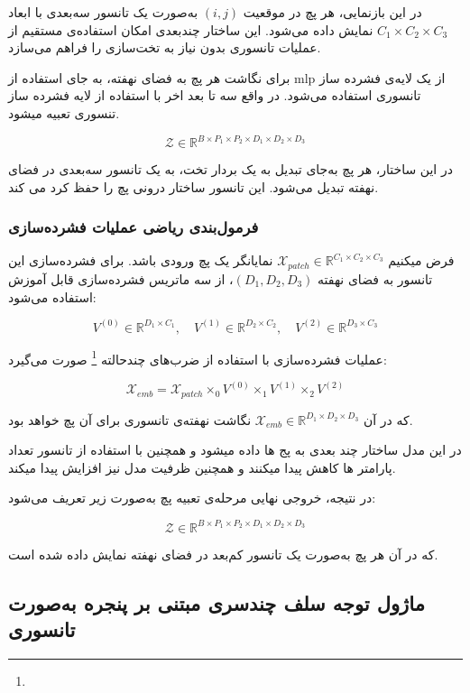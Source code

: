 در این بازنمایی، هر پچ در موقعیت $(i,j)$ به‌صورت یک تانسور سه‌بعدی با ابعاد $C_1 \times C_2 \times C_3$ نمایش داده می‌شود. این ساختار چندبعدی امکان استفاده‌ی مستقیم از عملیات تانسوری بدون نیاز به تخت‌سازی را فراهم می‌سازد.



برای نگاشت هر پچ به فضای نهفته، به جای استفاده از mlp  از یک لایه‌ی فشرده ساز تانسوری  استفاده می‌شود. در واقع سه تا بعد اخر با استفاده از لایه فشرده ساز تنسوری تعبیه میشود.

\[
\mathcal{Z} \in \mathbb{R}^{B \times P_1 \times P_2 \times D_1 \times D_2 \times D_3}
\]

در این ساختار، هر پچ به‌جای تبدیل به یک بردار تخت، به یک تانسور سه‌بعدی در فضای نهفته تبدیل می‌شود. این تانسور ساختار درونی پچ را حفظ کرد می کند. 

\subsubsection*{فرمول‌بندی ریاضی عملیات فشرده‌سازی}

فرض میکنیم  $\mathcal{X}_{patch} \in \mathbb{R}^{C_1 \times C_2 \times C_3}$ نمایانگر یک پچ ورودی باشد. برای فشرده‌سازی این تانسور به فضای نهفته $(D_1, D_2, D_3)$، از سه ماتریس فشرده‌سازی قابل آموزش استفاده می‌شود:

\[
V^{(0)} \in \mathbb{R}^{D_1 \times C_1}, \quad
V^{(1)} \in \mathbb{R}^{D_2 \times C_2}, \quad
V^{(2)} \in \mathbb{R}^{D_3 \times C_3}
\]

عملیات فشرده‌سازی با استفاده از ضرب‌های چندحالته \footnote{} صورت می‌گیرد:

\[
\mathcal{X}_{emb} = \mathcal{X}_{patch} \times_0 V^{(0)} \times_1 V^{(1)} \times_2 V^{(2)}
\]

که در آن $\mathcal{X}_{emb} \in \mathbb{R}^{D_1 \times D_2 \times D_3}$ نگاشت نهفته‌ی تانسوری برای آن پچ خواهد بود.

در این مدل ساختار چند بعدی به پج ها داده میشود و همچنین با استفاده از تانسور تعداد پارامتر ها کاهش پیدا میکنند و همچنین ظرفیت مدل نیز افزایش پیدا میکند.




در نتیجه، خروجی نهایی مرحله‌ی تعبیه پچ به‌صورت زیر تعریف می‌شود:

\[
\mathcal{Z} \in \mathbb{R}^{B \times P_1 \times P_2 \times D_1 \times D_2 \times D_3}
\]

که در آن هر پچ به‌صورت یک تانسور کم‌بعد در فضای نهفته نمایش داده شده است.


\subsection{ماژول توجه سلف چندسری مبتنی بر پنجره به‌صورت تانسوری}

